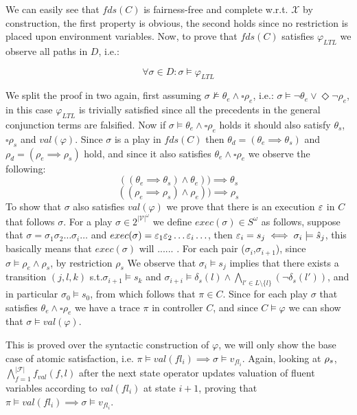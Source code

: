 We can easily see that $fds(C)$ is fairness-free and complete w.r.t. $\mathcal{X}$ by construction, the first property is obvious, the second holds since no restriction is placed upon environment variables. Now, to prove that $fds(C)$ satisfies $\varphi_{LTL}$ we observe all paths in $D$, i.e.:

\[\forall \sigma \in D: \sigma \models \varphi_{LTL} \]

We split the proof in two again, first assuming $\sigma \not\models \theta_e \wedge \square \rho_e$, i.e.: $\sigma \models \neg\theta_e \vee \Diamond \neg\rho_e$, in this case $\varphi_{LTL}$ is trivially satisfied since all the precedents in the general conjunction terms are falsified. Now if $\sigma \models \theta_e \wedge \square \rho_e$ holds it should also satisfy $\theta_s$, $\square\rho_s$ and $val(\varphi)$. Since $\sigma$ is a play in $fds(C)$ then $\theta_d=(\theta_e \implies \theta_s)$ and $\rho_d=(\rho_e \implies \rho_s)$ hold, and since it also satisfies $\theta_e \wedge \square \rho_e$ we observe the following:
\[((\theta_e \implies \theta_s) \wedge \theta_e))\implies \theta_s\]
\[((\rho_e \implies \rho_s) \wedge \rho_e))\implies \rho_s\]
To show that $\sigma$ also satisfies $val(\varphi)$ we prove that there is an execution ${\varepsilon}$ in $C$ that follows $\sigma$.
For a play $\sigma \in 2^{|\mathcal{V}|^{\omega}}$ we define $exec(\sigma) \in S^{\omega}$ as follows, suppose that $\sigma = \sigma_1 \sigma_2 \ldots \sigma_i \ldots$ and
$exec(\sigma)= {\varepsilon}_1 {\varepsilon}_2 \ldots {\varepsilon}_i \ldots$, then ${\varepsilon}_i = s_j \iff \sigma_i \models \hat{s}_{j}$, this basically means that $exec(\sigma)$ will ......   . For each pair ($\sigma_i$,$\sigma_{i+1}$), since $\sigma \models \rho_e \wedge \rho_s$, by restriction $\rho_s$
We observe that $\sigma_i \models s_j$ implies that there exists a transition $(j, l, k)$ s.t.$\sigma_{i+1} \models s_k$ and $\sigma_{i+i} \models \delta_s(l) \wedge \bigwedge_{l' \in L \setminus \{l\}}(\neg \delta_s(l'))$, and in particular $\sigma_0 \models s_0$, from which follows that $\pi \in C$.
Since for each play $\sigma$ that satisfies $\theta_e \wedge \square \rho_e$ we have a trace $\pi$ in controller $C$, and since $C \models \varphi$ we can show that $\sigma \models val(\varphi)$.


This is proved over the syntactic construction of $\varphi$, we will only show the base case of atomic satisfaction, i.e.
$\pi \models val(fl_i) \implies \sigma \models v_{fl_i}$. Again, looking at ${\rho_s}$, $\bigwedge_{f = 1}^{|\mathcal{F}|}f_{val}(f,l)$ after the next state operator updates valuation of fluent variables according to $val(fl_i)$ at state $i+1$, proving that $\pi \models val(fl_i) \implies \sigma \models v_{fl_i}$.


